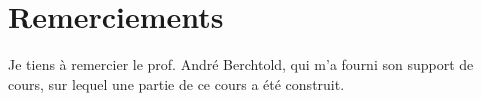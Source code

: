 \maketitle

\newpage
\thispagestyle{empty}
\phantom{Invisible}
\newpage
\thispagestyle{empty}
\nocite{Groebner2005}
\nocite{Wonnacott1991}


\thispagestyle{plain} 
\tableofcontents

\section*{Remerciements}
Je tiens \`a remercier le prof. Andr\'e Berchtold, qui m'a fourni son support de cours, sur lequel une partie de ce cours a \'et\'e construit.

